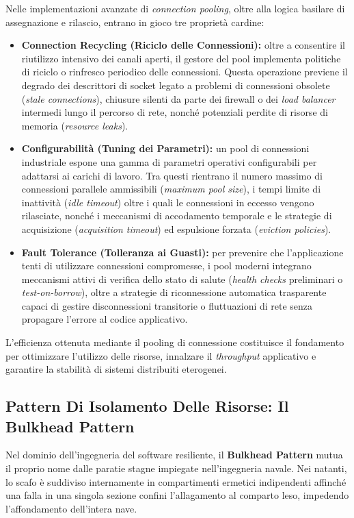 \documentclass[11pt, a4paper]{article}
\begin{document}
Nelle implementazioni avanzate di \emph{connection pooling}, oltre alla logica basilare di assegnazione e rilascio, entrano in gioco tre proprietà cardine:

\begin{itemize}[noitemsep]
    \item \textbf{Connection Recycling (Riciclo delle Connessioni):} oltre a consentire il riutilizzo intensivo dei canali aperti, il gestore del pool implementa politiche di riciclo o rinfresco periodico delle connessioni. Questa operazione previene il degrado dei descrittori di socket legato a problemi di connessioni obsolete (\emph{stale connections}), chiusure silenti da parte dei firewall o dei \emph{load balancer} intermedi lungo il percorso di rete, nonché potenziali perdite di risorse di memoria (\emph{resource leaks}).
    \item \textbf{Configurabilità (Tuning dei Parametri):} un pool di connessioni industriale espone una gamma di parametri operativi configurabili per adattarsi ai carichi di lavoro. Tra questi rientrano il numero massimo di connessioni parallele ammissibili (\emph{maximum pool size}), i tempi limite di inattività (\emph{idle timeout}) oltre i quali le connessioni in eccesso vengono rilasciate, nonché i meccanismi di accodamento temporale e le strategie di acquisizione (\emph{acquisition timeout}) ed espulsione forzata (\emph{eviction policies}).
    \item \textbf{Fault Tolerance (Tolleranza ai Guasti):} per prevenire che l'applicazione tenti di utilizzare connessioni compromesse, i pool moderni integrano meccanismi attivi di verifica dello stato di salute (\emph{health checks} preliminari o \emph{test-on-borrow}), oltre a strategie di riconnessione automatica trasparente capaci di gestire disconnessioni transitorie o fluttuazioni di rete senza propagare l'errore al codice applicativo.
\end{itemize}

L'efficienza ottenuta mediante il pooling di connessione costituisce il fondamento per ottimizzare l'utilizzo delle risorse, innalzare il \emph{throughput} applicativo e garantire la stabilità di sistemi distribuiti eterogenei.

\subsection{Pattern Di Isolamento Delle Risorse: Il Bulkhead Pattern}

Nel dominio dell'ingegneria del software resiliente, il \textbf{Bulkhead Pattern} mutua il proprio nome dalle paratie stagne impiegate nell'ingegneria navale. Nei natanti, lo scafo è suddiviso internamente in compartimenti ermetici indipendenti affinché una falla in una singola sezione confini l'allagamento al comparto leso, impedendo l'affondamento dell'intera nave.
\end{document}
